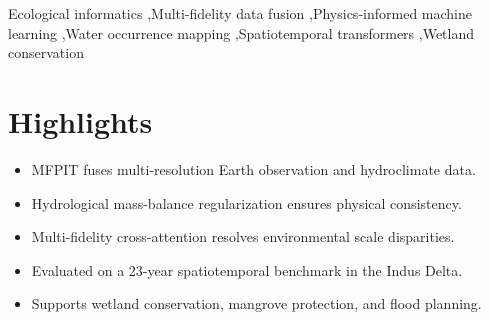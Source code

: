 \documentclass[preprint,12pt]{elsarticle}
\begin{document}
\begin{frontmatter}
\begin{abstract}
\textbf{Physical Consistency:} Joint physics and temporal regularization reduces test-set catchment mass-balance residuals ($\mathcal{L}_{\text{phys}}$) by 81.7\%--89.6\% and temporal state jitter ($\mathcal{L}_{\text{temp}}$) by 86.7\% relative to unconstrained training ($\lambda_{\text{phys}}=0.0$), achieving a patch-level water-fraction $R^2$ of 0.9564 ($\text{MAE} = 0.0458$) across the test holdout and preventing segmentation collapse during the catastrophic 2022 Pakistan mega-flood ($\text{IoU} = 0.6962$ vs.\ $0.4967$ unconstrained). 
\textbf{Applications \& Impact:} This framework delivers a principled, ecologically regularized decision-support methodology for estuarine conservation, mangrove habitat protection, and coastal flood-resilience planning in vulnerable, data-scarce deltas.
\end{abstract}

\begin{keyword}
Ecological informatics \sep Multi-fidelity data fusion \sep Physics-informed machine learning \sep Water occurrence mapping \sep Spatiotemporal transformers \sep Wetland conservation
\end{keyword}

\end{frontmatter}

\section*{Highlights}
\begin{itemize}
    \item MFPIT fuses multi-resolution Earth observation and hydroclimate data.
    \item Hydrological mass-balance regularization ensures physical consistency.
    \item Multi-fidelity cross-attention resolves environmental scale disparities.
    \item Evaluated on a 23-year spatiotemporal benchmark in the Indus Delta.
    \item Supports wetland conservation, mangrove protection, and flood planning.
\end{itemize}
\end{document}
